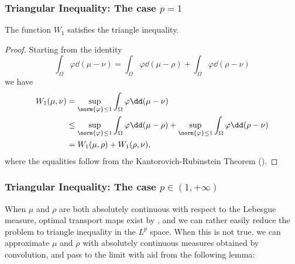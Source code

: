 \documentclass[oneside,reqno,letterpaper]{amsart}
\begin{document}
\subsubsection{Triangular Inequality: The case \texorpdfstring{\(p = 1\)}{p = 1}}
\begin{proposition}
  The function \(W_1\) satisfies the triangle inequality.
\end{proposition}
\begin{proof}
Starting from the identity
\[
  \int_{\Omega} \varphi \dd (\mu - \nu)
  = \int_{\Omega} \varphi \dd (\mu - \rho) + \int_{\Omega} \varphi \dd (\rho - \nu)
\]
we have
\begin{align*}
  W_1(\mu, \nu)
  &= \sup_{\norm{\varphi} \leq 1} \int_{\Omega} \varphi \dd (\mu - \nu) \\
  &\leq \sup_{\norm{\varphi} \leq 1} \int_{\Omega} \varphi \dd (\mu - \rho)
    + \sup_{\norm{\varphi} \leq 1} \int_{\Omega} \varphi \dd (\rho - \nu) \\
  &= W_1(\mu, \rho) + W_1(\rho, \nu),
\end{align*}
where the equalities follow from the Kantorovich-Rubinstein Theorem ().
\end{proof}


\subsubsection{Triangular Inequality: The case \texorpdfstring{\(p \in (1, +\infty)\)}{p > 1}}
When \(\mu\) and \(\rho\) are both absolutely continuous with respect to the Lebesgue measure, optimal transport maps exist by , and we can rather easily reduce the problem to triangle inequality in the \(L^p\) space.
When this is not true, we can approximate \(\mu\) and \(\rho\) with absolutely continuous measures obtained by convolution, and pass to the limit with aid from the following lemma:
\end{document}

